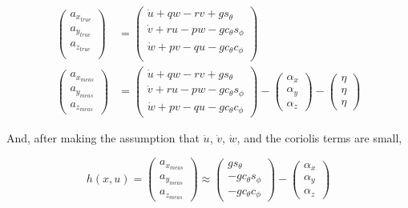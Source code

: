 \documentclass{article}
\newcommand{\cp}{c_{\phi}}
\newcommand{\ct}{c_{\theta}}
\newcommand{\sip}{s_{\phi}}
\newcommand{\sit}{s_{\theta}}
\begin{document}
\begin{equation}
\begin{aligned}
	\begin{pmatrix}
	a_{x_{true}} \\
	a_{y_{true}} \\
	a_{z_{true}} \\
	\end{pmatrix}
	&= 
	\begin{pmatrix}
	\dot{u} + qw - rv + g\sit \\
	\dot{v} + ru - pw - g\ct\sip \\
	\dot{w} + pv - qu - g\ct\cp \\
	\end{pmatrix} \\		
	\begin{pmatrix}
	a_{x_{meas}} \\
	a_{y_{meas}} \\
	a_{z_{meas}} \end{pmatrix}
	&= \begin{pmatrix}
	\dot{u} + qw - rv + g\sit \\
	\dot{v} + ru - pw - g\ct\sip \\
	\dot{w} + pv - qu - g\ct\cp \end{pmatrix}
		- \begin{pmatrix}
	\alpha_x \\
	\alpha_y \\
	\alpha_z \end{pmatrix}
	- \begin{pmatrix}
	\eta \\
	\eta \\
	\eta \end{pmatrix}
\end{aligned}
\end{equation}

And, after making the assumption that $\dot{u}$, $\dot{v}$, $\dot{w}$, and the coriolis terms are small,

\begin{equation}
	h(x,u) = 	\begin{pmatrix}
	a_{x_{meas}} \\
	a_{y_{meas}} \\
	a_{z_{meas}} \end{pmatrix}
	\approx \begin{pmatrix}
	g\sit \\
	-g\ct\sip \\
	-g\ct\cp \end{pmatrix}
	- \begin{pmatrix}
	\alpha_x \\
	\alpha_y \\
	\alpha_z \end{pmatrix}
\end{equation}
\end{document}
